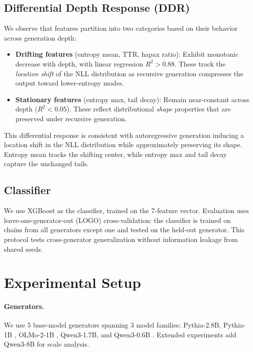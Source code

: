 \documentclass[11pt]{article}
\begin{document}
\subsection{Differential Depth Response (DDR)}
\label{sec:ddr}

We observe that features partition into two categories based on their behavior across generation depth:
\begin{itemize}
\item \textbf{Drifting features} (entropy mean, TTR, hapax ratio): Exhibit monotonic decrease with depth, with linear regression $R^2 > 0.88$. These track the \emph{location shift} of the NLL distribution as recursive generation compresses the output toward lower-entropy modes.
\item \textbf{Stationary features} (entropy max, tail decay): Remain near-constant across depth ($R^2 < 0.05$). These reflect distributional \emph{shape} properties that are preserved under recursive generation.
\end{itemize}

This differential response is consistent with autoregressive generation inducing a location shift in the NLL distribution while approximately preserving its shape. Entropy mean tracks the shifting center, while entropy max and tail decay capture the unchanged tails.

\subsection{Classifier}
\label{sec:classifier}

We use XGBoost \cite{chen2016xgboost} as the classifier, trained on the 7-feature vector. Evaluation uses leave-one-generator-out (LOGO) cross-validation: the classifier is trained on chains from all generators except one and tested on the held-out generator. This protocol tests cross-generator generalization without information leakage from shared seeds.

\section{Experimental Setup}
\label{sec:setup}

\paragraph{Generators.}
We use 5 base-model generators spanning 3 model families: Pythia-2.8B, Pythia-1B \cite{biderman2023pythia}, OLMo-2-1B \cite{groeneveld2024olmo}, Qwen3-1.7B, and Qwen3-0.6B \cite{yang2025qwen3}. Extended experiments add Qwen3-8B for scale analysis.
\end{document}

